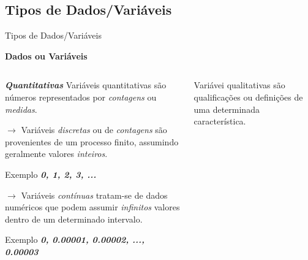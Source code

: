 \documentclass{bredelebeamer}
\begin{document}
\subsection{Tipos de Dados/Variáveis}

\begin{frame}{Tipos de Dados/Variáveis}
\begin{center}
\textbf{\alert{Dados ou Variáveis}}
\end{center}

\begin{columns}
\begin{column}{0.5\textwidth}
\begin{alertblock}{\textbf{\emph{Quantitativas}}}
Variáveis quantitativas são números representados por \emph{contagens}
ou \emph{medidas}.
\end{alertblock}

\vspace{.5cm}

\footnotesize{
\textbf{$\rightarrow$} Variáveis \emph{discretas} ou de \emph{contagens}
são provenientes de um processo finito, assumindo geralmente valores
\emph{inteiros}. \\

\begin{flushright}
Exemplo \textbf{\emph{0, 1, 2, 3, ...}}
\end{flushright}
}

\vspace{.5cm}

\footnotesize{
\textbf{$\rightarrow$} Variáveis \emph{contínuas} tratam-se de dados
numéricos que podem assumir \emph{infinitos} valores dentro de um
determinado intervalo. \\

\begin{flushright}
Exemplo \textbf{\emph{0, 0.00001, 0.00002, ..., 0.00003}}
\end{flushright}
}

\vspace{1.15cm}

\end{column}

\begin{column}{0.5\textwidth}
\begin{exampleblock}{\textbf{}}
Variávei qualitativas são qualificações ou definições
\textbf{} de uma determinada característica. 
\end{exampleblock}


\end{column}
\end{columns}
\end{frame}
\end{document}
